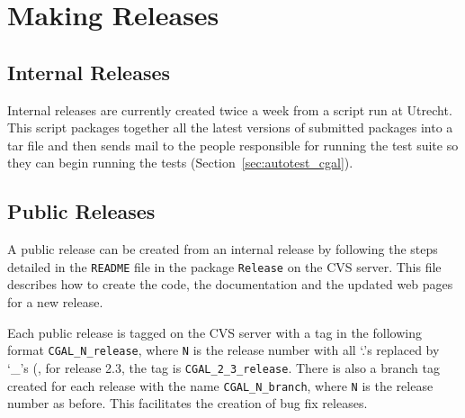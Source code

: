 \chapter{Making Releases}
\label{chap:releases}

\section{Internal Releases}
\label{sec:internal_releases}

Internal releases are currently created twice a week from a script run
at Utrecht.  This script packages together all the latest versions of
submitted packages into a tar file and then sends mail to the people
responsible for running the test suite so they can begin running the
tests (Section~\ref{sec:autotest_cgal}).

\section{Public Releases}
\label{sec:public_releases}

A public release can be created from an internal release by following the
steps detailed in the
\texttt{README} file in the package \texttt{Release} on the CVS server.
This file describes how to create the code, the documentation and the
updated web pages for a new release.

Each public release is tagged on the CVS server with a tag in the following
format \texttt{CGAL\_N\_release}, where \texttt{N} is the release number
with all `.'s replaced by `\_'s (\eg, for release 2.3, the tag is
\texttt{CGAL\_2\_3\_release}.  There is also a branch tag created for
each release with the name \texttt{CGAL\_N\_branch}, where \texttt{N} is
the release number as before.  This facilitates the creation of bug fix
releases.

